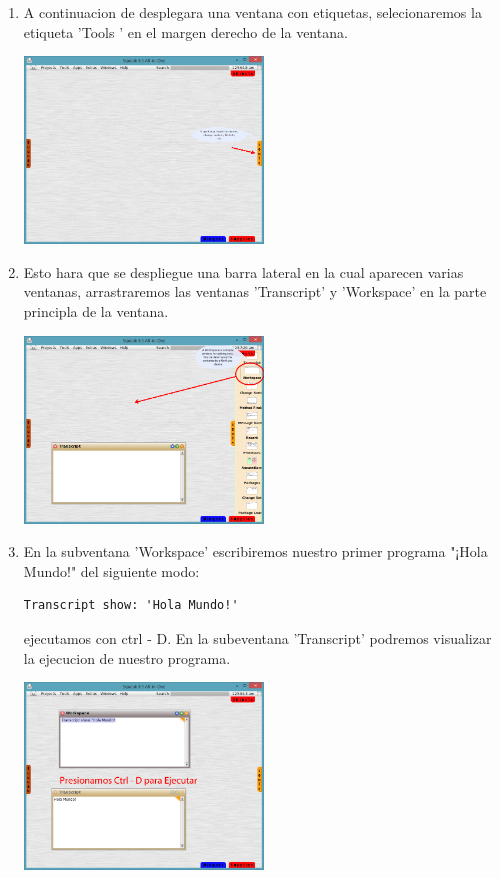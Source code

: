 \documentclass[11pt]{article}
\begin{document}
\begin{enumerate}
\item
A continuacion de desplegara una ventana con etiquetas, selecionaremos la etiqueta 'Tools ' en el margen derecho de la ventana.
				\begin{center}
				\includegraphics[width=0.5\textwidth]{images/tools}
				\end{center}
\item
Esto hara que se despliegue una barra lateral en la cual aparecen varias ventanas, arrastraremos las ventanas 'Transcript' y 'Workspace' en la parte principla de la ventana.
				\begin{center}
				\includegraphics[width=0.5\textwidth]{images/drag_tools}
				\end{center}
\item
En la subventana 'Workspace' escribiremos nuestro primer programa "¡Hola Mundo!" del siguiente modo:
\begin{lstlisting}
Transcript show: 'Hola Mundo!'
\end{lstlisting}
ejecutamos con ctrl - D. En la subeventana 'Transcript' podremos visualizar la ejecucion de nuestro programa.
				\begin{center}
				\includegraphics[width=0.5\textwidth]{images/executing}
				\end{center}



\end{enumerate}


\end{document}
